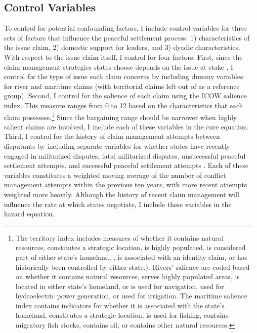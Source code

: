 \documentclass[../../dissertation.tex]{subfiles}
\begin{document}


\subsection{Control Variables}




To control for potential confounding factors, I include control variables for three sets of factors that influence the peaceful settlement process: 1) characteristics of the issue claim, 2) domestic support for leaders, and 3) dyadic characteristics. With respect to the issue claim itself, I control for four factors. First, since the claim management strategies states choose depends on the issue at stake \citep{hensel2008, owsiak2017}, I control for the type of issue each claim concerns by including dummy variables for river and maritime claims (with territorial claims left out of as a reference group). Second, I control for the salience of each claim using the ICOW salience index. This measure ranges from 0 to 12 based on the characteristics that each claim possesses.\footnote{The territory index includes measures of whether it contains natural resources, constitutes a strategic location, is highly populated, is considered part of either state’s homeland, , is associated with an identity claim, or has historically been controlled by either state.). Rivers’ salience are coded based on whether it contains natural resources, serves highly populated areas, is located in either state’s homeland, or is used for navigation, used for hydroelectric power generation, or used for irrigation. The maritime salience index contains indicators for whether it is associated with the state’s homeland, constitutes a strategic location, is used for fishing, contains migratory fish stocks, contains oil, or contains other natural resources.} Since the bargaining range should be narrower when highly salient claims are involved, I include each of these variables in the cure equation. Third, I control for the history of claim management attempts between disputants by including separate variables for whether states have recently engaged in militarized disputes, fatal militarized disputes, unsuccessful peaceful settlement attempts, and successful peaceful settlement attempts \citep{hensel2001, hensel2008}. Each of these variables constitutes a weighted moving average of the number of conflict management attempts within the previous ten years, with more recent attempts weighted more heavily. Although the history of recent claim management will influence the rate at which states negotiate, I include these variables in the hazard equation.
\end{document}
